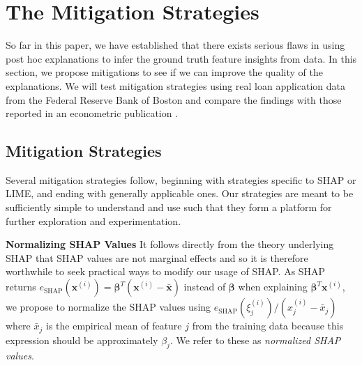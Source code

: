 \documentclass[12pt]{article}  %
\begin{document}
    
\vspace{-3mm}\section{The Mitigation Strategies}
  \label{sec:mitigation_strategies}\vspace{-3mm}
  So far in this paper, we have established that there exists serious flaws in using post hoc explanations to infer the ground truth feature insights from data. In this section, we propose mitigations to see if we can improve the quality of the explanations. We will test mitigation strategies using real loan application data from the Federal Reserve Bank of Boston \citep{hunter1996cultural} and compare the findings with those reported in an econometric publication \citep{bane2006econometric}.
    
\vspace{-3mm}   \subsection{Mitigation Strategies}
    \vspace{-3mm} 
    Several mitigation strategies follow, beginning with strategies specific to SHAP or LIME, and ending with generally applicable ones. Our strategies are meant to be sufficiently simple to understand and use such that they form a platform for further exploration and experimentation. 
    
    \noindent\textbf{Normalizing SHAP Values}
        It follows directly from the theory underlying SHAP that SHAP values are not marginal effects and so it is therefore worthwhile to seek practical ways to modify our usage of SHAP. As SHAP returns $e_{\text{SHAP}}(\mathbf{x}^{(i)})=\boldsymbol{\beta}^T(\mathbf{x}^{(i)} - \bar{\mathbf{x}})$ instead of $\boldsymbol{\beta}$ when explaining $\boldsymbol{\beta}^T \mathbf{x}^{(i)}$,  we propose to normalize the SHAP values using $e_{\text{SHAP}}(\xi^{(i)}_j) / (x^{(i)}_j - \bar{x}_j)$ where $\bar{x}_j$ is the empirical mean of feature $j$ from the training data because this expression should be approximately $\beta_j$. We refer to these as \emph{normalized SHAP values}.  %
        
\end{document}
